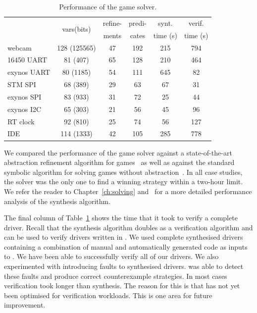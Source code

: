 \begin{table}
    \center
    \begin{tabular}{|l|ccccc|}
        \hline
                       & \multirow{2}{*}{vars(bits)} & refine- & predi- & synt.     & verif.   \\
                       &                             & ments   & cates  & time (s)  & time (s) \\
        \hline
        \hline
        webcam         & 128 (125565)                & 47      & 192    & 215       & 794 \\
        16450 UART     & 81  (407)                   & 65      & 128    & 210       & 464 \\
        exynos UART    & 80  (1185)                  & 54      & 111    & 645       & 82 \\
        STM SPI        & 68  (389)                   & 29      & 63     & 67        & 31 \\
        exynos SPI     & 83  (933)                   & 31      & 72     & 25        & 44 \\
        exynos I2C     & 65  (303)                   & 21      & 56     & 45        & 96 \\
        RT clock       & 92  (810)                   & 25      & 74     & 56        & 127 \\
        IDE            & 114 (1333)                  & 42      & 105    & 285       & 778 \\
        \hline
    \end{tabular}
    \caption{Performance of the \termite game solver.}
    \label{t:perf}
\end{table}

We compared the performance of the \termite game solver against a state-of-the-art abstraction refinement algorithm for games~\cite{Alfaro_Roy_07} as well as against the standard symbolic algorithm for solving games without abstraction~\cite{Piterman_PS_06}.  In all case studies, the \termite solver was the only one to find a winning strategy within a two-hour limit.  We refer the reader to Chapter~\ref{ch:solving} and~\cite{Walker_Ryzhyk_14} for a more detailed performance analysis of the \termite synthesis algorithm.

The final column of Table~\ref{t:perf} shows the time that it took \termite to verify a complete driver.  Recall that the \termite synthesis algorithm doubles as a verification algorithm and can be used to verify drivers written in \tsl.  We used complete synthesised drivers containing a combination of manual and automatically generated code as inputs to \termite.  We have been able to successfully verify all of our drivers.  We also experimented with introducing faults to synthesised drivers.  \termite was able to detect these faults and produce correct counterexample strategies.  In most cases verification took longer than synthesis.  The reason for this is that \termite has not yet been optimised for verification workloads.  This is one area for future improvement.


